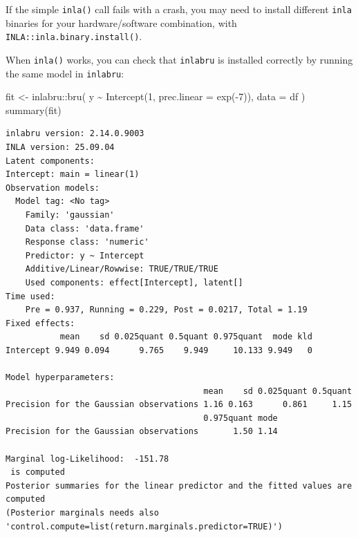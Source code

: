 \documentclass[
  letterpaper,
  DIV=11,
  numbers=noendperiod]{scrartcl}
\newenvironment{Shaded}{\begin{snugshade}}{\end{snugshade}}
\newcommand{\AttributeTok}[1]{\textcolor[rgb]{0.40,0.45,0.13}{#1}}
\newcommand{\DecValTok}[1]{\textcolor[rgb]{0.68,0.00,0.00}{#1}}
\newcommand{\FunctionTok}[1]{\textcolor[rgb]{0.28,0.35,0.67}{#1}}
\newcommand{\NormalTok}[1]{\textcolor[rgb]{0.00,0.23,0.31}{#1}}
\newcommand{\OtherTok}[1]{\textcolor[rgb]{0.00,0.23,0.31}{#1}}
\newcommand{\SpecialCharTok}[1]{\textcolor[rgb]{0.37,0.37,0.37}{#1}}
\begin{document}
If the simple \texttt{inla()} call fails with a crash, you may need to
install different \texttt{inla} binaries for your hardware/software
combination, with \texttt{INLA::inla.binary.install()}.

When \texttt{inla()} works, you can check that \texttt{inlabru} is
installed correctly by running the same model in \texttt{inlabru}:

\begin{Shaded}
\begin{Highlighting}[]
\NormalTok{fit }\OtherTok{\textless{}{-}}\NormalTok{ inlabru}\SpecialCharTok{::}\FunctionTok{bru}\NormalTok{(}
\NormalTok{  y }\SpecialCharTok{\textasciitilde{}} \FunctionTok{Intercept}\NormalTok{(}\DecValTok{1}\NormalTok{, }\AttributeTok{prec.linear =} \FunctionTok{exp}\NormalTok{(}\SpecialCharTok{{-}}\DecValTok{7}\NormalTok{)),}
  \AttributeTok{data =}\NormalTok{ df}
\NormalTok{)}
\FunctionTok{summary}\NormalTok{(fit)}
\end{Highlighting}
\end{Shaded}

\begin{verbatim}
inlabru version: 2.14.0.9003 
INLA version: 25.09.04 
Latent components:
Intercept: main = linear(1)
Observation models:
  Model tag: <No tag>
    Family: 'gaussian'
    Data class: 'data.frame'
    Response class: 'numeric'
    Predictor: y ~ Intercept
    Additive/Linear/Rowwise: TRUE/TRUE/TRUE
    Used components: effect[Intercept], latent[] 
Time used:
    Pre = 0.937, Running = 0.229, Post = 0.0217, Total = 1.19 
Fixed effects:
           mean    sd 0.025quant 0.5quant 0.975quant  mode kld
Intercept 9.949 0.094      9.765    9.949     10.133 9.949   0

Model hyperparameters:
                                        mean    sd 0.025quant 0.5quant
Precision for the Gaussian observations 1.16 0.163      0.861     1.15
                                        0.975quant mode
Precision for the Gaussian observations       1.50 1.14

Marginal log-Likelihood:  -151.78 
 is computed 
Posterior summaries for the linear predictor and the fitted values are computed
(Posterior marginals needs also 'control.compute=list(return.marginals.predictor=TRUE)')
\end{verbatim}
\end{document}
